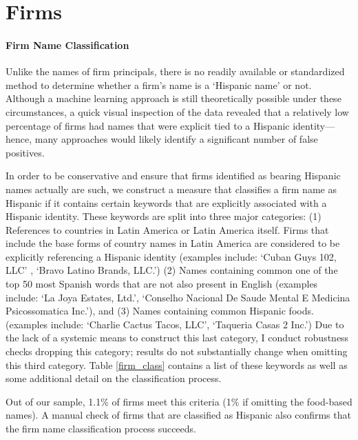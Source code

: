 \documentclass[11pt]{article}
\begin{document}

\section{Firms}\label{secfirm}



\paragraph{Firm Name Classification} Unlike the names of firm principals, there is no readily available or standardized method to determine whether a firm's name is a `Hispanic name' or not. Although a machine learning approach is still theoretically possible under these circumstances, a quick visual inspection of the data revealed that a relatively low percentage of firms had names that were explicit tied to a Hispanic identity---hence, many approaches would likely identify a significant number of false positives.

In order to be conservative and ensure that firms identified as bearing Hispanic names actually are such, we construct a measure that classifies a firm name as Hispanic if it contains certain keywords that are explicitly associated with a Hispanic identity. These keywords are split into three major categories: (1) References to countries in Latin America or Latin America itself. Firms that include the base forms of country names in Latin America are considered to be explicitly referencing a Hispanic identity (examples include: `Cuban Guys 102, LLC' , `Bravo Latino Brands, LLC.') (2) Names containing common one of the top 50 most Spanish words that are not also present in English (examples include: `La Joya Estates, Ltd.', `Conselho Nacional De Saude Mental E Medicina Psicossomatica Inc.'), and (3) Names containing common Hispanic foods. (examples include: `Charlie Cactus Tacos, LLC', `Taqueria Casas 2 Inc.') Due to the lack of a systemic means to construct this last category, I conduct robustness checks dropping this category; results do not substantially change when omitting this third category. Table \ref{firm_class} contains a list of these keywords as well as some additional detail on the classification process.

Out of our sample, 1.1\% of firms meet this criteria (1\% if omitting the food-based names). A manual check of firms that are classified as Hispanic also confirms that the firm name classification process succeeds.
\end{document}
